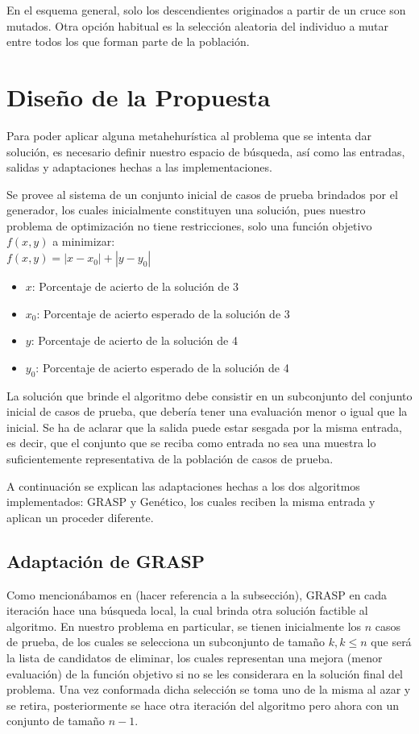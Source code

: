 \documentclass[a4paper,12pt]{book}
\begin{document}
		En el esquema general, solo los descendientes originados a partir de un cruce son mutados. Otra opción habitual es la selección aleatoria del individuo a mutar entre todos los que forman parte de la población.
		
		
\chapter{Diseño de la Propuesta}
	Para poder aplicar alguna metahehurística al problema que se intenta dar solución, es necesario definir nuestro espacio de búsqueda, así como las entradas, salidas y adaptaciones hechas a las implementaciones.
	
	Se provee al sistema de un conjunto inicial de casos de prueba brindados por el generador, los cuales inicialmente constituyen una solución, pues nuestro problema de optimización no tiene restricciones, solo una función objetivo $f(x,y)$ a minimizar: \\
	
	$ f(x,y) = |x - x_0| + |y - y_0|$ 
	
	\begin{itemize}
		\item $x$: Porcentaje de acierto de la solución de 3
		\item $x_0$: Porcentaje de acierto esperado de la solución de 3
		\item $y$: Porcentaje de acierto de la solución de 4
		\item $y_0$: Porcentaje de acierto esperado de la solución de 4
	\end{itemize}

	La solución que brinde el algoritmo debe consistir en un subconjunto del conjunto inicial de casos de prueba, que debería tener una evaluación menor o igual que la inicial. Se ha de aclarar que la salida puede estar sesgada por la misma entrada, es decir, que el conjunto que se reciba como entrada no sea una muestra lo suficientemente representativa de la población de casos de prueba.
	
	A continuación se explican las adaptaciones hechas a los dos algoritmos implementados: GRASP y Genético, los cuales reciben la misma entrada y aplican un proceder diferente.
	
	\section{Adaptación de GRASP}
		Como mencionábamos en (hacer referencia a la subsección), GRASP en cada iteración hace una búsqueda local, la cual brinda otra solución factible al algoritmo. En nuestro problema en particular, se tienen inicialmente los $n$ casos de prueba, de los cuales se selecciona un subconjunto de tamaño $k, k \leq n$ que será la lista de candidatos de eliminar, los cuales representan una mejora (menor evaluación) de la función objetivo si no se les considerara en la solución final del problema. Una vez conformada dicha selección se toma uno de la misma al azar y se retira, posteriormente se hace otra iteración del algoritmo pero ahora con un conjunto de tamaño $n-1$.
		
\end{document}
